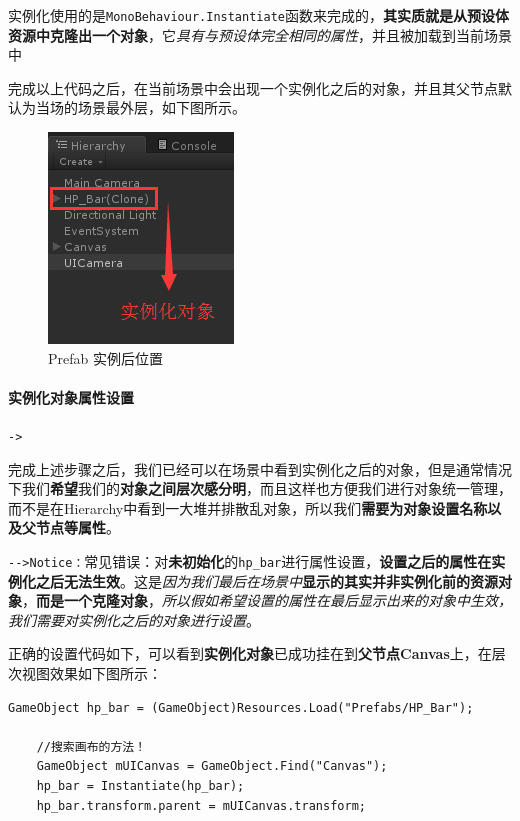 \documentclass[UTF8,a4paper,12pt]{ctexbook}
\begin{document}
				实例化使用的是\verb|MonoBehaviour.Instantiate|函数来完成的，\textbf{其实质就是从预设体资源中克隆出一个对象}，它\textit{具有与预设体完全相同的属性}，并且被加载到当前场景中
				
				完成以上代码之后，在当前场景中会出现一个实例化之后的对象，并且其父节点默认为当场的场景最外层，如下图所示。
					\begin{figure}[H]
						\centering
						\includegraphics[scale=0.8]{Prefab-2.png}
						\caption{Prefab 实例后位置}
					\end{figure}
				
			\paragraph{实例化对象属性设置}\verb|->|
				
				完成上述步骤之后，我们已经可以在场景中看到实例化之后的对象，但是通常情况下我们\textbf{希望}我们的\textbf{对象之间层次感分明}，而且这样也方便我们进行对象统一管理，而不是在Hierarchy中看到一大堆并排散乱对象，所以我们\textbf{需要为对象设置名称以及父节点等属性}。
			
				\verb|-->Notice：|常见错误：对\textbf{未初始化}的\verb|hp_bar|进行属性设置，\textbf{设置之后的属性在实例化之后无法生效}。这是\textit{因为我们最后在场景中}\textbf{显示的其实并非实例化前的资源对象}，\textbf{而是一个克隆对象}，\color{blue}\textit{所以假如希望设置的属性在最后显示出来的对象中生效，我们需要对实例化之后的对象进行设置}。\color{black}
			
			  正确的设置代码如下，可以看到\textbf{实例化对象}已成功挂在到\textbf{父节点Canvas}上，在层次视图效果如下图所示：
			  	\begin{lstlisting}[xleftmargin = .079\textwidth, frame = L]
	GameObject hp_bar = (GameObject)Resources.Load("Prefabs/HP_Bar");
	
	//搜索画布的方法！
	GameObject mUICanvas = GameObject.Find("Canvas");
	hp_bar = Instantiate(hp_bar);
	hp_bar.transform.parent = mUICanvas.transform;
			  	\end{lstlisting}
			  	
\end{document}
